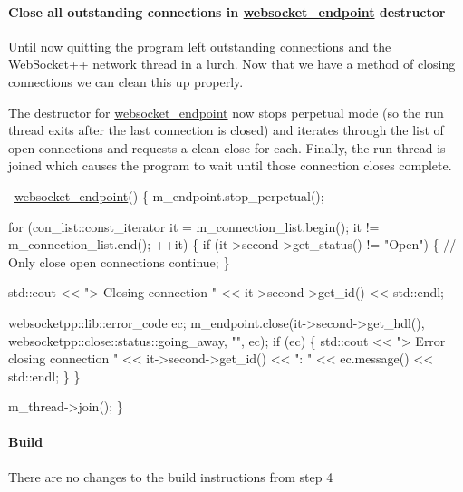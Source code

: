 \paragraph*{Close all outstanding connections in {\ttfamily \mbox{\hyperlink{classwebsocket__endpoint}{websocket\+\_\+endpoint}}} destructor}

Until now quitting the program left outstanding connections and the Web\+Socket++ network thread in a lurch. Now that we have a method of closing connections we can clean this up properly.

The destructor for {\ttfamily \mbox{\hyperlink{classwebsocket__endpoint}{websocket\+\_\+endpoint}}} now stops perpetual mode (so the run thread exits after the last connection is closed) and iterates through the list of open connections and requests a clean close for each. Finally, the run thread is joined which causes the program to wait until those connection closes complete.


\begin{DoxyCode}
~\mbox{\hyperlink{classwebsocket__endpoint}{websocket\_endpoint}}() \{
    m\_endpoint.stop\_perpetual();

    \textcolor{keywordflow}{for} (con\_list::const\_iterator it = m\_connection\_list.begin(); it != m\_connection\_list.end(); ++it) \{
        \textcolor{keywordflow}{if} (it->second->get\_status() != \textcolor{stringliteral}{"Open"}) \{
            \textcolor{comment}{// Only close open connections}
            \textcolor{keywordflow}{continue};
        \}

        std::cout << \textcolor{stringliteral}{"> Closing connection "} << it->second->get\_id() << std::endl;

        websocketpp::lib::error\_code ec;
        m\_endpoint.close(it->second->get\_hdl(), websocketpp::close::status::going\_away, \textcolor{stringliteral}{""}, ec);
        \textcolor{keywordflow}{if} (ec) \{
            std::cout << \textcolor{stringliteral}{"> Error closing connection "} << it->second->get\_id() << \textcolor{stringliteral}{": "}  
                      << ec.message() << std::endl;
        \}
    \}

    m\_thread->join();
\}
\end{DoxyCode}


\paragraph*{Build}

There are no changes to the build instructions from step 4

